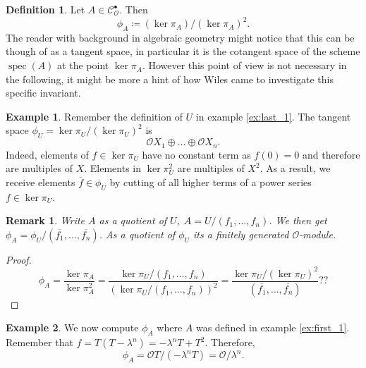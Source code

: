 \documentclass{article}
\theoremstyle{plain}%
\newtheorem{remark}{Remark}[section]
\theoremstyle{definition}
\newtheorem{definition}{Definition}[section]
\newtheorem{example}{Example}[section]
\theoremstyle{remark}
\newcommand{\cob}{\mathcal{C}_\mathcal{O}^\bullet}
\begin{document}
    \begin{definition}
        Let \(A \in \cob\). Then
        \[\phi_A \coloneqq (\ker \pi_A)/(\ker \pi_A)^2.\]
        The reader with background in algebraic geometry might notice that this can be though of as a tangent space, 
        in particular it is the cotangent space of the scheme \(\operatorname{spec}(A)\) at the point \(\ker \pi_A\).
        However this point of view is not necessary in the following, 
        it might be more a hint of how Wiles came to investigate this specific invariant.
    \end{definition}

    \begin{example}\label{ex:last_phi}
        Remember the definition of \(U\) in example \ref{ex:last_1}.
        The tangent space \(\phi_U = \ker \pi_U/(\ker \pi_U)^2\) is
        \[
            \mathcal{O}X_1 \oplus \dots \oplus \mathcal{O}X_n.
        \]
        Indeed, elements of \(f \in \ker \pi_U\) have no constant term as \(f(0) = 0\) and therefore are multiples of \(X\).
        Elements in \(\ker \pi_U^2\) are multiples of \(X^2\). As a result, we receive elements \(\overline{f} \in \phi_U\) by
        cutting of all higher terms of a power series \(f \in \ker \pi_U\).
    \end{example}

    \begin{remark}
        Write \(A\) as a quotient of \(U,\; A = U/(f_1, \dots, f_n)\).
        We then get \(\phi_A = \phi_U/(\overline{f_1}, \dots, \overline{f_n})\).
        As a quotient of \(\phi_U\) its a finitely generated \(\mathcal{O}\)-module.
    \end{remark}
    \begin{proof}
        \[\phi_A = \frac{\ker \pi_A}{\ker \pi_A^2} = \frac{\ker \pi_U/(f_1, \dots, f_n)}{(\ker \pi_U/(f_1, \dots, f_n))^2}
         = \frac{\ker \pi_U/(\ker \pi_U)^2}{(\overline{f_1}, \dots, \overline{f_n})}??\]
    \end{proof}

    \begin{example}\label{ex:first_phi}
        We now compute \(\phi_A\) where \(A\) was defined in example \ref{ex:first_1}.
        Remember that \(f = T(T-\lambda^n) = -\lambda^n T + T^2\). Therefore,
        \[\phi_A = \mathcal{O}T/(-\lambda^n T) = \mathcal{O}/\lambda^n.\]
    \end{example}
\end{document}
